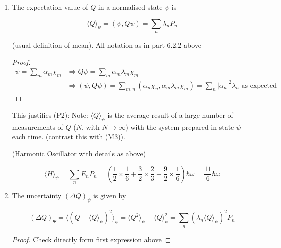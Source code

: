 \documentclass[a4paper]{article}
\begin{document}
\begin{enumerate}
	\item The expectation value of $ Q $ in a normalised state $ \psi $ is
	
	\[ \langle Q \rangle_{\psi}  = (\psi, Q \psi) = \sum_{n} \lambda_{n} P_{n} \]
	
	(usual definition of mean). All notation as in part 6.2.2 above
	
	\begin{proof}
		\begin{align*}
		\psi = \sum_{m} \alpha_{m} \chi_{m} & \Rightarrow Q \psi = \sum_{m} \alpha_{m} \lambda_{m} \chi_{m} \\
		& \Rightarrow (\psi,Q\psi) = \sum_{m,n} (\alpha_{n}\chi_{n}, \alpha_{m} \lambda_{m} \chi_{m} ) = \sum_{n} | \alpha_{n} |^{2} \lambda_{n} \text{ as expected}
		\end{align*}
	\end{proof}

This justifies (P2):
Note: $ \langle Q \rangle_{\psi} $ is the average result of a large number of measurements of $ Q $ ($ N $, with $ N \to \infty $) with the system prepared in state $ \psi $ each time. (contrast this with (M3)).

\begin{eg} (Harmonic Oscillator with details as above)
	
	\[ \langle H \rangle_{\psi}  = \sum_{n} E_{n} P_{n} = ( \frac{1}{2} \times \frac{1}{6}   + \frac{3}{2} \times \frac{2}{3} + \frac{9}{2} \times \frac{1}{6}  )\hbar \omega = \frac{11}{6} \hbar \omega \]
	
\end{eg}
	
	
	\item The uncertainty $ (\Delta Q)_{\psi} $ is given by
	
	\[ (\Delta Q)_{\Psi} = \langle (Q - \langle Q \rangle_{\psi})^{2} \rangle_{\psi} = \langle Q^{2} \rangle_{\psi} - \langle Q \rangle_{\psi}^{2} = \sum_{n} (\lambda_{n} \langle Q \rangle_{\psi} )^{2} P_{n} \]
	
	\begin{proof}
		Check directly form first expression above 
	\end{proof}
\end{enumerate}








  
\end{document}
